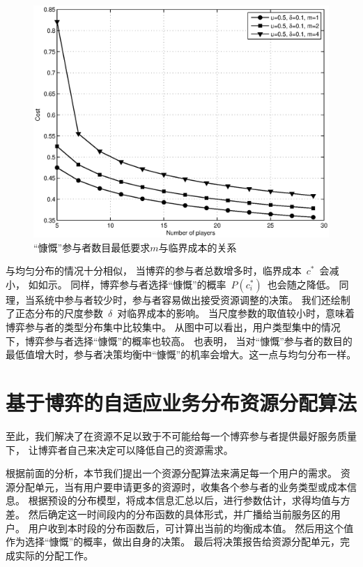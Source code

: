 \begin{figure}[!tb]
\begin{centering}
\includegraphics[scale=0.5]{bayesian_normal_punish_parameter_vs_contribute_probability.eps}
\caption{“慷慨”参与者数目最低要求$m$与临界成本的关系}
\label{fig:bayesian_normal_puni_para_vs_cont_prob}
\end{centering}
\end{figure}

与均匀分布的情况十分相似，
当博弈的参与者总数增多时，临界成本~$c^*$~会减小， 如如示。
同样，博弈参与者选择“慷慨”的概率~$P(c_i^*)$~也会随之降低。
同理，当系统中参与者较少时，参与者容易做出接受资源调整的决策。
我们还绘制了正态分布的尺度参数~$\delta$~对临界成本的影响。
当尺度参数的取值较小时，意味着博弈参与者的类型分布集中比较集中。
从图中可以看出，用户类型集中的情况下，博弈参与者选择“慷慨”的概率也较高。
也表明，
当对“慷慨”参与者的数目的最低值增大时，参与者决策均衡中“慷慨”的机率会增大。这一点与均匀分布一样。

\section{基于博弈的自适应业务分布资源分配算法}
至此，我们解决了在资源不足以致于不可能给每一个博弈参与者提供最好服务质量下，
让博弈者自己来决定可以降低自己的资源需求。

根据前面的分析，本节我们提出一个资源分配算法来满足每一个用户的需求。
资源分配单元，当有用户要申请更多的资源时，收集各个参与者的业务类型或成本信息。
根据预设的分布模型，将成本信息汇总以后，进行参数估计，求得均值与方差。
然后确定这一时间段内的分布函数的具体形式，并广播给当前服务区的用户。
用户收到本时段的分布函数后，可计算出当前的均衡成本值。
然后用这个值作为选择“慷慨”的概率，做出自身的决策。
最后将决策报告给资源分配单元，完成实际的分配工作。

